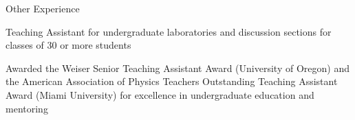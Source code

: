 \begin{cventries}
    \cventry
    {Other Experience} %
    {} %
    {} %
    {} %
    {
      \begin{cvitems} %
        \item {Teaching Assistant for undergraduate laboratories and discussion sections for classes of 30 or more students}
        \item {Awarded the Weiser Senior Teaching Assistant Award (University of Oregon) and the American Association of Physics Teachers Outstanding Teaching Assistant Award (Miami University) for excellence in undergraduate education and mentoring}
      \end{cvitems}
    }    


\end{cventries}


